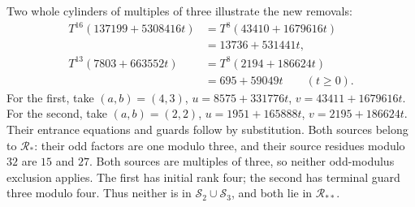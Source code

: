 \documentclass[11pt,letterpaper]{article}
\begin{document}
Two whole cylinders of multiples of three illustrate the new removals:
\[
\begin{aligned}
T^{16}(137199+5308416t)&=T^8(43410+1679616t)\\
                     &=13736+531441t,\\
T^{13}(7803+663552t)&=T^8(2194+186624t)\\
                  &=695+59049t\qquad(t\ge0).
\end{aligned}
\]
For the first, take \((a,b)=(4,3)\),
\(u=8575+331776t\), \(v=43411+1679616t\).
For the second, take \((a,b)=(2,2)\),
\(u=1951+165888t\), \(v=2195+186624t\).
Their entrance equations and guards follow by substitution.
Both sources belong to \(\mathcal R_*\): their odd factors are one
modulo three, and their source residues modulo \(32\) are \(15\)
and \(27\). Both sources are multiples of three, so neither odd-modulus
exclusion applies. The first has initial rank four; the second has
terminal guard three modulo four. Thus neither is in
\(\mathcal S_2\cup\mathcal S_3\), and both lie in \(\mathcal R_{**}\).
\end{document}
